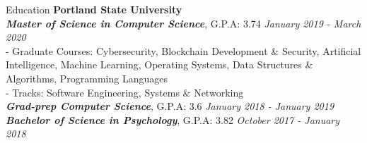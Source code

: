 \documentclass{resume} %
\begin{document}

\begin{rSection}{Education}
{\bf Portland State University} 
  \\{\bf {\em Master of Science in Computer Science}}, { G.P.A: 3.74 }\hfill {\em January 2019 - March 2020}
  \\{ \small{ \hspace{10mm} - Graduate Courses:}} {\small{Cybersecurity, Blockchain Development \& Security, Artificial Intelligence, Machine Learning, Operating Systems, Data Structures \& Algorithms, Programming Languages}}
  \\{ \small{ \hspace{10mm} - Tracks:}} {\small{Software Engineering, Systems \& Networking}}
  \\ {\bf \em Grad-prep Computer Science}, { G.P.A: 3.6 }\hfill {\em January 2018 - January 2019}
  \\ {\bf \em Bachelor of Science in Psychology}, { G.P.A: 3.82 }\hfill {\em October 2017 - January 2018}  


\end{rSection}
\end{document}

